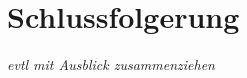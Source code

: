 \documentclass[12pt,twoside]{article}
\theoremstyle{plain}
\theoremstyle{definition}
\theoremstyle{remark}
\begin{document}
\section{Schlussfolgerung}
\label{sec:concl}
\textit{evtl mit Ausblick zusammenziehen}



%
%
\newpage


\nocite{*}
\end{document}
